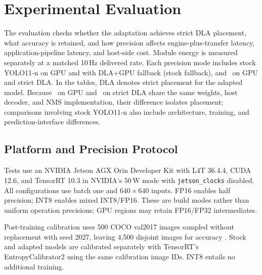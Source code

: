 \section{Experimental Evaluation}
\label{sec:eval}
The evaluation checks whether the adaptation achieves strict DLA placement, what accuracy is retained, and how precision affects engine-plus-transfer latency, application-pipeline latency, and host-side cost. Module energy is measured separately at a matched 10\,Hz delivered rate. Each precision mode
includes stock YOLO11-n on GPU and with DLA+GPU fallback (stock fallback), and \model\ on GPU
and strict DLA. In the tables, DLA denotes strict placement for the adapted model.
Because \model\ on GPU and \model\ on strict DLA share the same weights, host
decoder, and NMS implementation, their difference isolates placement;
comparisons involving stock YOLO11-n also include architecture, training, and
prediction-interface differences.

\subsection{Platform and Precision Protocol}
\label{sec:setup}
Tests use an NVIDIA Jetson AGX Orin Developer Kit with L4T 36.4.4, CUDA 12.6,
and TensorRT 10.3 in NVIDIA's 50\,W mode with \texttt{jetson\_clocks} disabled.
All configurations use batch one and $640\times640$ inputs. FP16 enables
half precision; INT8 enables mixed INT8/FP16. These are build modes rather
than uniform operation precisions; GPU regions may retain FP16/FP32 intermediates.

Post-training calibration uses 500 COCO val2017 images sampled without
replacement with seed 2027, leaving 4,500 disjoint images for accuracy
\cite{lin2014coco}. Stock and adapted models are calibrated separately with
TensorRT's EntropyCalibrator2 using the same calibration image IDs.
INT8 entails no additional training.

